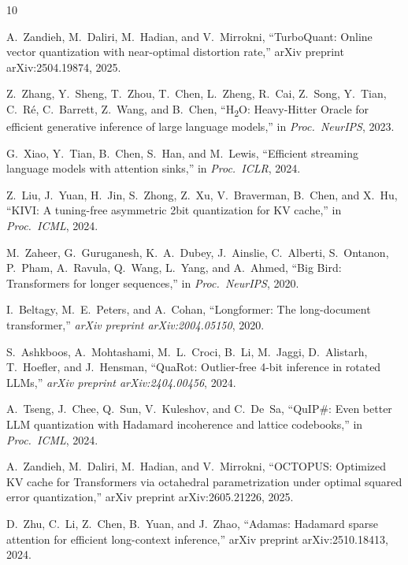 \documentclass[conference,10pt]{IEEEtran}
\begin{document}

\begin{thebibliography}{10}

A.~Zandieh, M.~Daliri, M.~Hadian, and V.~Mirrokni,
``TurboQuant: Online vector quantization with near-optimal distortion rate,''
arXiv preprint arXiv:2504.19874, 2025.

Z.~Zhang, Y.~Sheng, T.~Zhou, T.~Chen, L.~Zheng, R.~Cai, Z.~Song,
Y.~Tian, C.~R\'{e}, C.~Barrett, Z.~Wang, and B.~Chen,
``H\textsubscript{2}O: Heavy-Hitter Oracle for efficient generative inference
of large language models,''
in \emph{Proc.\ NeurIPS}, 2023.

G.~Xiao, Y.~Tian, B.~Chen, S.~Han, and M.~Lewis,
``Efficient streaming language models with attention sinks,''
in \emph{Proc.\ ICLR}, 2024.

Z.~Liu, J.~Yuan, H.~Jin, S.~Zhong, Z.~Xu, V.~Braverman, B.~Chen, and X.~Hu,
``KIVI: A tuning-free asymmetric 2bit quantization for KV cache,''
in \emph{Proc.\ ICML}, 2024.

M.~Zaheer, G.~Guruganesh, K.~A.~Dubey, J.~Ainslie, C.~Alberti,
S.~Ontanon, P.~Pham, A.~Ravula, Q.~Wang, L.~Yang, and A.~Ahmed,
``Big Bird: Transformers for longer sequences,''
in \emph{Proc.\ NeurIPS}, 2020.

I.~Beltagy, M.~E.~Peters, and A.~Cohan,
``Longformer: The long-document transformer,''
\emph{arXiv preprint arXiv:2004.05150}, 2020.

S.~Ashkboos, A.~Mohtashami, M.~L.~Croci, B.~Li, M.~Jaggi, D.~Alistarh,
T.~Hoefler, and J.~Hensman,
``QuaRot: Outlier-free 4-bit inference in rotated LLMs,''
\emph{arXiv preprint arXiv:2404.00456}, 2024.

A.~Tseng, J.~Chee, Q.~Sun, V.~Kuleshov, and C.~De~Sa,
``QuIP\#: Even better LLM quantization with Hadamard incoherence and
lattice codebooks,''
in \emph{Proc.\ ICML}, 2024.

A.~Zandieh, M.~Daliri, M.~Hadian, and V.~Mirrokni,
``OCTOPUS: Optimized KV cache for Transformers via octahedral parametrization
under optimal squared error quantization,''
arXiv preprint arXiv:2605.21226, 2025.

D.~Zhu, C.~Li, Z.~Chen, B.~Yuan, and J.~Zhao,
``Adamas: Hadamard sparse attention for efficient long-context inference,''
arXiv preprint arXiv:2510.18413, 2024.

\end{thebibliography}
\end{document}
